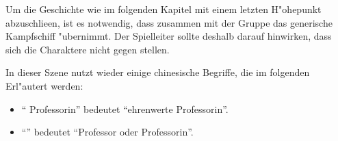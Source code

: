 \begin{remarks}
	Um die Geschichte wie im folgenden Kapitel mit einem letzten H"ohepunkt abzuschlie\3en, ist es notwendig, dass \xl{} zusammen mit der Gruppe das generische Kampfschiff "ubernimmt. Der Spielleiter sollte deshalb darauf hinwirken, dass sich die Charaktere nicht gegen \xl{} stellen.

	In dieser Szene nutzt \xl{} wieder einige chinesische Begriffe, die im folgenden Erl"autert werden:

	\begin{itemize}
		\item "` Professorin"' bedeutet "`ehrenwerte Professorin"'.
		\item "`"' bedeutet "`Professor oder Professorin"'.		
	\end{itemize}
	 
\end{remarks}
